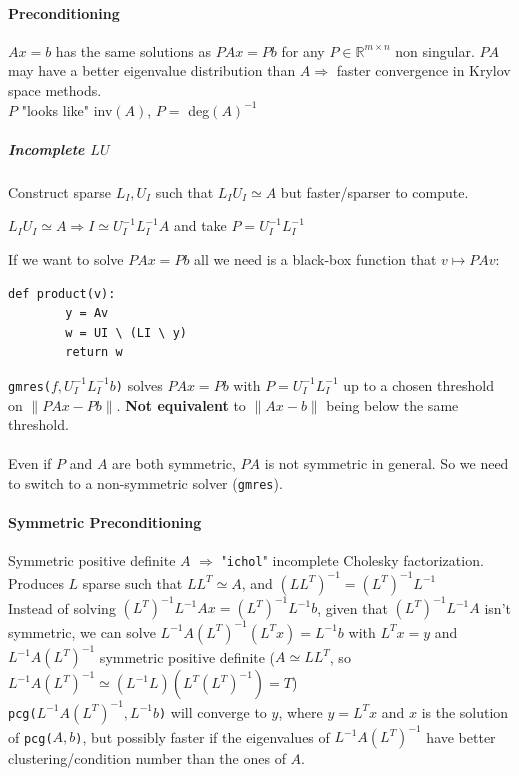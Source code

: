 \documentclass[10pt]{report}
\begin{document}
\paragraph{Preconditioning} $Ax=b$ has the same solutions as $PAx = Pb$ for any $P\in \mathbb{R}^{m\times n}$ non singular. $PA$ may have a better eigenvalue distribution than $A\Rightarrow$ faster convergence in Krylov space methods.\\
$P$ "looks like" inv$(A)$, $P =$ deg$(A)^{-1}$
\subparagraph{Incomplete $LU$} Construct sparse $L_I, U_I$ such that $L_IU_I\simeq A$ but faster/sparser to compute.\begin{list}{}{}
	\item $L_IU_I\simeq A \Rightarrow I \simeq U_I^{-1}L_I^{-1}A$ and take $P = U_I^{-1}L_I^{-1}$
\end{list}
If we want to solve $PAx=Pb$ all we need is a black-box function that $v\mapsto PAv$:
\begin{lstlisting}[style=myPython]
	def product(v):
		y = Av
		w = UI \ (LI \ y)
		return w
\end{lstlisting}
\texttt{gmres($f, U_I^{-1}L_I^{-1}b$)} solves $PAx=Pb$ with $P = U_I^{-1}L_I^{-1}$ up to a chosen threshold on $\|PAx-Pb\|$. \textbf{Not equivalent} to $\|Ax-b\|$ being below the same threshold.\\\\
Even if $P$ and $A$ are both symmetric, $PA$ is not symmetric in general. So we need to switch to a non-symmetric solver (\texttt{gmres}).
\paragraph{Symmetric Preconditioning} Symmetric positive definite $A$ $\Rightarrow$ "\texttt{ichol}" incomplete Cholesky factorization. Produces $L$ sparse such that $LL^T\simeq A$, and $(LL^T)^{-1}=(L^T)^{-1}L^{-1}$\\
Instead of solving $(L^T)^{-1}L^{-1}Ax = (L^T)^{-1}L^{-1}b$, given that $(L^T)^{-1}L^{-1}A$ isn't symmetric, we can solve $L^{-1}A(L^T)^{-1}(L^Tx) = L^{-1}b$ with $L^Tx=y$ and $L^{-1}A(L^T)^{-1}$ symmetric positive definite ($A\simeq LL^T$, so $L^{-1}A(L^T)^{-1}\simeq(L^{-1}L)(L^T(L^T)^{-1}) = T$)\\
\texttt{pcg($L^{-1}A(L^T)^{-1},L^{-1}b$)} will converge to $y$, where $y=L^Tx$ and $x$ is the solution of \texttt{pcg($A,b$)}, but possibly faster if the eigenvalues of $L^{-1}A(L^T)^{-1}$ have better clustering/condition number than the ones of $A$.
\end{document}
